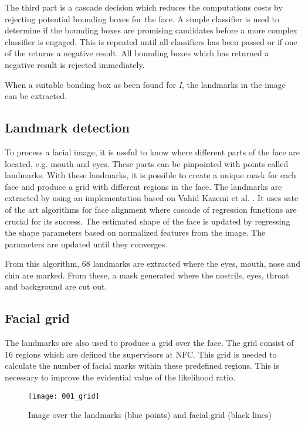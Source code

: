 The third part is a cascade decision which reduces the computations costs by rejecting potential bounding boxes for the face. A simple classifier is used to determine if the bounding boxes are promising candidates before a more complex classifier is engaged. This is repeated until all classifiers has been passed or if one of the returns a negative result. All bounding boxes which has returned a negative result is rejected immediately.  

When a suitable bonding box as been found for \textit{I}, the landmarks in the image can be extracted. 

\subsection{Landmark detection}

To process a facial image, it is useful to know where different parts of the face are located, e.g. mouth and eyes. These parts can be pinpointed with points called landmarks. With these landmarks, it is possible to create a unique mask for each face and produce a grid with different regions in the face. The landmarks are extracted by using an implementation based on Vahid Kazemi et al. \cite{dlib_landmark}. It uses sate of the art algorithms for face alignment where cascade of regression functions are crucial for its success. The estimated shape of the face is updated by regressing the shape parameters based on normalized features from the image. The parameters are updated until they converges.

From this algorithm, 68 landmarks are extracted where the eyes, mouth, nose and chin are marked. From these, a mask generated where the nostrils, eyes, throat and background are cut out. 

\subsection{Facial grid}

The landmarks are also used to produce a grid over the face. The grid consist of 16 regions which are defined the supervisors at NFC. This grid is needed to calculate the number of facial marks within these predefined regions. This is necessary to improve the evidential value of the likelihood ratio.

\begin{figure}[h!]
	\centering
	\texttt{[image: 001\_grid]}
	\caption{Image over the landmarks (blue points) and facial grid (black lines) \label{fig:grid_img}}
\end{figure}

